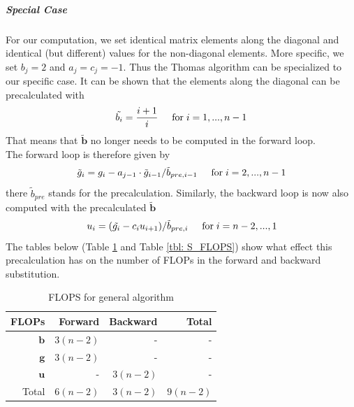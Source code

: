 \documentclass[%
oneside,                 %
final,                   %
10pt]{article}
\begin{document}
\subparagraph{Special Case}
For our computation, we set identical matrix elements along the diagonal and identical (but different) values for the non-diagonal elements. More specific, we set $b_j = 2$ and $a_j = c_j = -1$. Thus the Thomas algorithm can be specialized to our specific case. It can be shown that the elements along the diagonal can be precalculated with
\begin{equation}
\tilde{b_i} = \frac{i+1}{i} \hspace{0.5cm} \mathrm{for} \hspace{0.1cm} i=1,...,n-1 
\end{equation}
That means that $\mathbf{\tilde{b}}$ no longer needs to be computed in the forward loop. \\
The forward loop is therefore given by
\begin{equation}
\tilde{g}_i = g_i - a_{j-1} \cdot \tilde{g}_{i-1} / \tilde{b}_{pre, i-1}  \hspace{0.5cm} \mathrm{for} \hspace{0.1cm} i=2,..., n-1 \\
\end{equation}
there $\tilde{b}_{pre}$ stands for the precalculation.
Similarly, the backward loop is now also computed with the precalculated $\mathbf{\tilde{b}}$
\begin{equation}
u_i = ( \tilde{g_i}-c_i u_{i+1} )/ \tilde{b}_{pre,i} \hspace{0.5cm} \mathrm{for} \hspace{0.1cm} i=n-2,...,1 
\end{equation}
The tables below (Table \ref{tbl: G_FLOPS} and Table \ref{tbl: S_FLOPS}) show what effect this precalculation has on the number of FLOPs in the forward and backward substitution.

\begin{table}[H]
\caption{FLOPS for general algorithm}
\centering
	\begin{tabular}{r r r r}
		\toprule
		FLOPs   & Forward & Backward & Total \\ [0.5ex]
		\midrule
		$\mathbf{b}$ & $3 (n-2)$       & -        & -    \\
		$\mathbf{g}$ & $3 (n-2)$       & -       & -    \\
        	$\mathbf{u}$ & -      & $3 (n-2)$         & -     \\
        	Total        & $6 (n-2)$       & $3 (n-2)$        &  $9 (n-2)$      \\ [1ex]
		\bottomrule
	\end{tabular}
	\label{tbl: G_FLOPS}
\end{table}	
\end{document}
